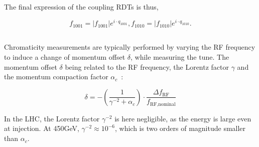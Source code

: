 The final expression of the coupling RDTs is thus,

\begin{equation}
    f_{1001} = |f_{1001}|e^{i\cdot q_{1001}},
    f_{1010} = |f_{1010}|e^{i\cdot q_{1010}}.
\end{equation}


\paragraph{}




\paragraph{}

\paragraph{}



\subsection{}
\label{subsection:optics_corrections_chromaticity}


Chromaticity measurements are typically performed by varying the RF frequency to induce a change of
momentum offset $\delta$, while measuring the tune. The momentum offset $\delta$ being related to
the RF frequency, the Lorentz factor $\gamma$ and the momentum compaction factor
$\alpha_c$~\cite{keintzel_jacqueline_beam_nodate}:

\begin{equation}
    \delta = - \left(\frac{1}{\gamma^{-2} + \alpha_c}\right) \cdot \frac{\Delta f_{\text{RF}}}{f_{\text{RF,nominal}}}
    \label{eq:dpp_rf}
\end{equation}

In the LHC, the Lorentz factor $\gamma^{-2}$ is here negligible, as the energy is large even at
injection.  At 450GeV, $\gamma^{-2} \approx 10^{-6}$, which is two orders of magnitude smaller than
$\alpha_c$.

